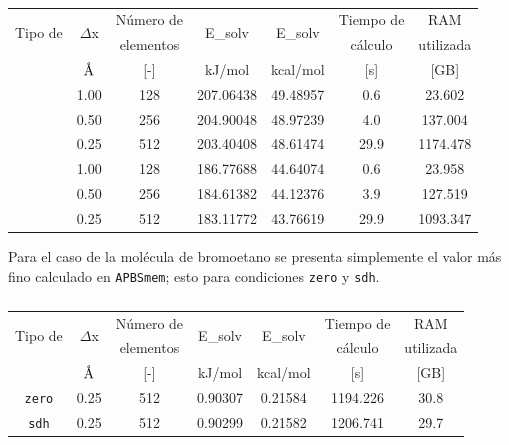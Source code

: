 \documentclass[12pt, oneside, numbers, spanish]{ezthesis}
\numberwithin{equation}{section}
\newcommand{\angstrom}{\text{\normalfont\AA}}
\begin{document}
\begin{table}[H]
	\centering
	\caption{}
	\def\arraystretch{0.8}
	\begin{tabular}{|c|cccccc|}\hline
		\multirow{2}{*}{Tipo de} & \multirow{2}{*}{$\Delta$x} & Número de & \multirow{2}{*}{E\_solv} & \multirow{2}{*}{E\_solv} & Tiempo de & RAM\\
		\multirow{2}{*}{condición} &  & elementos &  &  & cálculo & utilizada\\\cline{2-7}
		&  $\angstrom$ & [-] & kJ/mol & kcal/mol & [s] & [GB] \\\hline
		\parbox[t]{2mm}{} & 1.00 & 128 & 207.06438 & 49.48957 & 0.6 & 23.602 \\
		& 0.50 & 256 & 204.90048 & 48.97239 & 4.0 & 137.004 \\
		& 0.25 & 512 & 203.40408 & 48.61474 & 29.9 & 1174.478 \\ \hline
		\parbox[t]{2mm}{} & 1.00 & 128 & 186.77688 & 44.64074 & 0.6 & 23.958 \\
		& 0.50 & 256 & 184.61382 & 44.12376 & 3.9 & 127.519 \\
		& 0.25 & 512 & 183.11772 & 43.76619 & 29.9 & 1093.347 \\ \hline
	\end{tabular}\label{table:apbs_3q}
\end{table}

\noindent
Para el caso de la molécula de bromoetano se presenta simplemente el valor más fino calculado en \texttt{APBSmem}; esto para condiciones \texttt{zero} y \texttt{sdh}.

\begin{table}[H]
	\centering
	\caption{}
	\def\arraystretch{0.8}
	\begin{tabular}{|c|cccccc|}\hline
		\multirow{2}{*}{Tipo de} & \multirow{2}{*}{$\Delta$x} & Número de & \multirow{2}{*}{E\_solv} & \multirow{2}{*}{E\_solv} & Tiempo de & RAM\\
		\multirow{2}{*}{condición} &  & elementos &  &  & cálculo & utilizada\\\cline{2-7}
		&  $\angstrom$ & [-] & kJ/mol & kcal/mol & [s] & [GB] \\\hline
	\texttt{zero} & 0.25 & 512 & 0.90307 & 0.21584 & 1194.226 & 30.8 \\
	\texttt{sdh} & 0.25 & 512 & 0.90299 & 0.21582 & 1206.741 & 29.7 \\ \hline
	\end{tabular}\label{table:apbs_brom}
\end{table}
\end{document}
